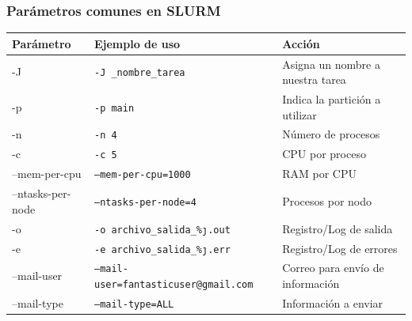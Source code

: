 \documentclass[aspectratio=169,professionalfonts]{beamer}
\begin{document}
\begin{frame}[fragile]
\frametitle{\textbf{Parámetros comunes en SLURM}}
\scriptsize
{}
\begin{tabular}{|p{2.5cm}|p{5.5cm}|p{4.5cm}|}
\hline
\rowcolor{blue!20}
\textbf{Parámetro} & \textbf{Ejemplo de uso} & \textbf{Acción} \\
\hline
-J & \texttt{-J \_nombre\_tarea} & Asigna un nombre a nuestra tarea \\
-p & \texttt{-p main} & Indica la partición a utilizar \\
-n & \texttt{-n 4} & Número de procesos \\
-c & \texttt{-c 5} & CPU por proceso \\
--mem-per-cpu & \texttt{--mem-per-cpu=1000} & RAM por CPU \\
--ntasks-per-node & \texttt{--ntasks-per-node=4} & Procesos por nodo \\
-o & \texttt{-o archivo\_salida\_\%\j.out} & Registro/Log de salida \\
-e & \texttt{-e archivo\_salida\_\%\j.err} & Registro/Log de errores \\
--mail-user & \texttt{--mail-user=fantasticuser@gmail.com} & Correo para envío de información \\
--mail-type & \texttt{--mail-type=ALL} & Información a enviar \\
\hline
\end{tabular}
\end{frame}
\end{document}
